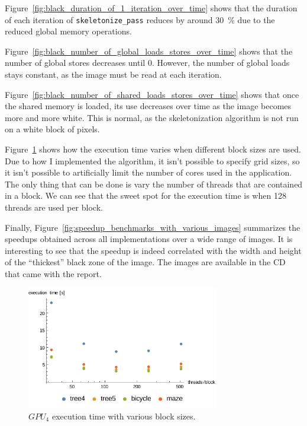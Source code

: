\documentclass[11pt,a4paper]{article}
\begin{document}
        Figure~\ref{fig:black_duration_of_1_iteration_over_time} shows that the duration of each iteration of \verb+skeletonize_pass+ reduces by around 30~\% due to the reduced global memory operations.

        Figure~\ref{fig:black_number_of_global_loads_stores_over_time} shows that the number of global stores decreases until 0.
        However, the number of global loads stays constant, as the image must be read at each iteration.

        Figure~\ref{fig:black_number_of_shared_loads_stores_over_time} shows that once the shared memory is loaded, its use decreases over time as the image becomes more and more white.
        This is normal, as the skeletonization algorithm is not run on a white block of pixels.

        Figure~\ref{fig:gpu4_execution_time_with_various_block_sizes} shows how the execution time varies when different block sizes are used.
        Due to how I implemented the algorithm, it isn't possible to specify grid sizes, so it isn't possible to artificially limit the number of cores used in the application.
        The only thing that can be done is vary the number of threads that are contained in a block.
        We can see that the sweet spot for the execution time is when 128 threads are used per block.

        Finally, Figure~\ref{fig:speedup_benchmarks_with_various_images} summarizes the speedups obtained across all implementations over a wide range of images.
        It is interesting to see that the speedup is indeed correlated with the width and height of the ``thickest'' black zone of the image. The images are available in the CD that came with the report.

        \begin{figure}[h]
            \centering
            \includegraphics[width=0.75\textwidth]{figs/block_size_plot.pdf}
            \caption{$GPU_{4}$ execution time with various block sizes.}
            \label{fig:gpu4_execution_time_with_various_block_sizes}
        \end{figure}
\end{document}
